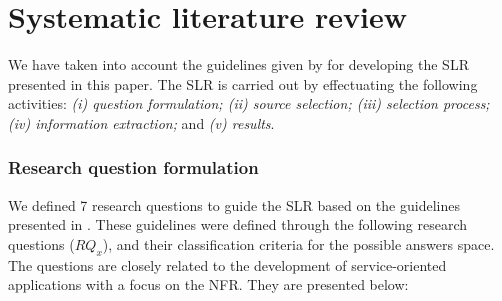 \appendix
\chapter{Systematic literature review}
\label{append:systematic_literature_review}
 



We have taken into account the guidelines given by \cite{Kitchenham08} for
 developing the SLR presented in this paper. The SLR is carried out by
 effectuating the following activities: \textit{(i) question formulation; (ii)
 source selection; (iii) selection process; (iv) information extraction;} and
 \textit{(v) results}.



\subsection{Research question formulation}
\label{subsec:question}

We defined 7 research questions to
guide the SLR based on the guidelines presented in
\cite{Kitchenham08,BiolchiniMNCT07}. These guidelines were defined through the
following research questions (\textit{$RQ_x$}), and their classification
criteria for the possible answers space. The questions are closely related to
the development of service-oriented applications with a focus on the NFR. They are presented below:
  
